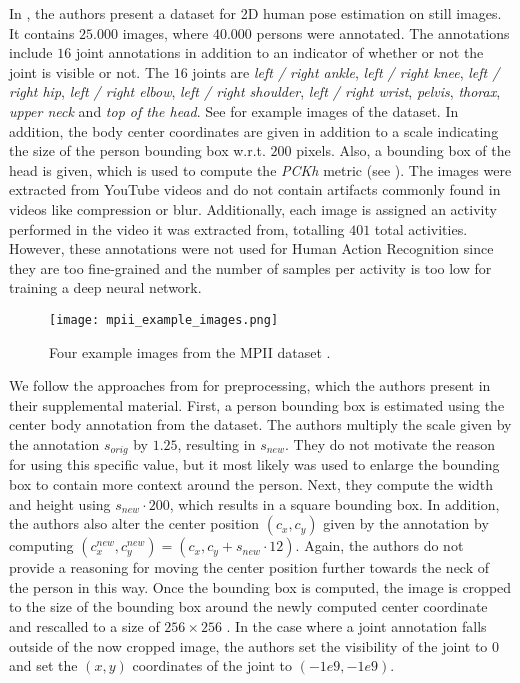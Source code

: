 In \cite{andriluka_2d_2014}, the authors present a dataset for 2D human pose estimation on still images.
It contains $25.000$ images, where $40.000$ persons were annotated.
The annotations include $16$ joint annotations in addition to an indicator of whether or not the joint is visible or not.
The $16$ joints are \textit{left / right ankle}, \textit{left / right knee}, \textit{left / right hip}, \textit{left / right elbow}, \textit{left / right shoulder}, \textit{left / right wrist}, \textit{pelvis}, \textit{thorax}, \textit{upper neck} and \textit{top of the head}.
See  for example images of the dataset.
In addition, the body center coordinates are given in addition to a scale indicating the size of the person bounding box w.r.t. $200$ pixels.
Also, a bounding box of the head is given, which is used to compute the \textit{PCKh} metric (see ).
The images were extracted from YouTube videos and do not contain artifacts commonly found in videos like compression or blur.
Additionally, each image is assigned an activity performed in the video it was extracted from, totalling $401$ total activities.
However, these annotations were not used for Human Action Recognition since they are too fine-grained and the number of samples per activity is too low for training a deep neural network.

\begin{figure}[htb!]
    \centering
    \texttt{[image: mpii\_example\_images.png]}
    \caption{Four example images from the MPII dataset \cite{andriluka_2d_2014}. }
    \label{fig:mpii_example_images}
\end{figure}

We follow the approaches from \cite{luvizon_2d/3d_2018} for preprocessing, which the authors present in their supplemental material.
First, a person bounding box is estimated using the center body annotation from the dataset.
The authors multiply the scale given by the annotation $s_{orig}$ by $1.25$, resulting in $s_{new}$.
They do not motivate the reason for using this specific value, but it most likely was used to enlarge the bounding box to contain more context around the person.
Next, they compute the width and height using $s_{new} \cdot 200$, which results in a square bounding box.
In addition, the authors also alter the center position $(c_x,  c_y)$ given by the annotation by computing $(c_{x}^{new}, c_y^{new}) = (c_x, c_y + s_{new} \cdot 12)$.
Again, the authors do not provide a reasoning for moving the center position further towards the neck of the person in this way.
Once the bounding box is computed, the image is cropped to the size of the bounding box around the newly computed center coordinate and rescalled to a size of $256 \times 256$ .
In the case where a joint annotation falls outside of the now cropped image, the authors set the visibility of the joint to $0$ and set the $(x,y)$ coordinates of the joint to $(-1e9, -1e9)$.

